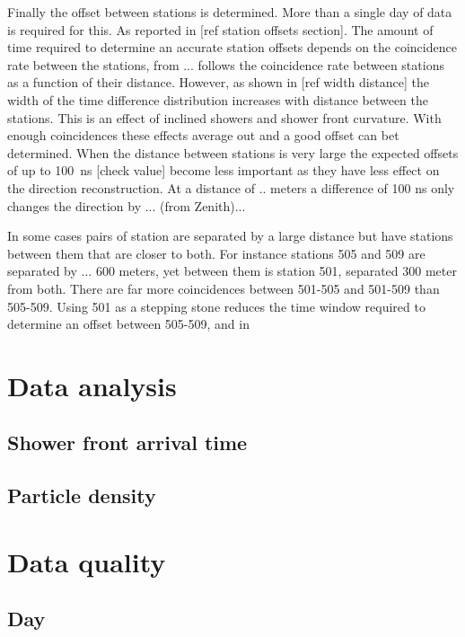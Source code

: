 Finally the offset between stations is determined. More than a single day of data is required for this. As reported in [ref station offsets section]. The amount of time required to determine an accurate station offsets depends on the coincidence rate between the stations, from ... follows the coincidence rate between stations as a function of their distance. However, as shown in [ref width distance] the width of the time difference distribution increases with distance between the stations. This is an effect of inclined showers and shower front curvature. With enough coincidences these effects average out and a good offset can bet determined. When the distance between stations is very large the expected \gps offsets of up to \SI{100}{\ns} [check value] become less important as they have less effect on the direction reconstruction. At a distance of .. meters a difference of 100 ns only changes the direction by ... (from Zenith)...

In some cases pairs of station are separated by a large distance but have stations between them that are closer to both. For instance stations 505 and 509 are separated by ... 600 meters, yet between them is station 501, separated 300 meter from both. There are far more coincidences between 501-505 and 501-509 than 505-509. Using 501 as a stepping stone reduces the time window required to determine an offset between 505-509, and in


\section{Data analysis}

\subsection{Shower front arrival time}

\subsection{Particle density}


\section{Data quality}

\subsection{Day}

